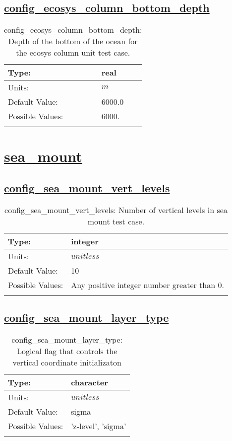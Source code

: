 \subsection[config\_ecosys\_column\_bottom\_depth]{\hyperref[sec:nm_tab_ecosys_column]{config\_ecosys\_column\_bottom\_depth}}
\label{subsec:nm_sec_config_ecosys_column_bottom_depth}
\begin{center}
\begin{longtable}{| p{2.0in} || p{4.0in} |}
    \hline
    Type: & real \\
    \hline
    Units: & $m$ \\
    \hline
    Default Value: & 6000.0 \\
    \hline
    Possible Values: & 6000. \\
    \hline
    \caption{config\_ecosys\_column\_bottom\_depth: Depth of the bottom of the ocean for the ecosys column unit test case.}
\end{longtable}
\end{center}
\section[sea\_mount]{\hyperref[sec:nm_tab_sea_mount]{sea\_mount}}
\label{sec:nm_sec_sea_mount}
\subsection[config\_sea\_mount\_vert\_levels]{\hyperref[sec:nm_tab_sea_mount]{config\_sea\_mount\_vert\_levels}}
\label{subsec:nm_sec_config_sea_mount_vert_levels}
\begin{center}
\begin{longtable}{| p{2.0in} || p{4.0in} |}
    \hline
    Type: & integer \\
    \hline
    Units: & $unitless$ \\
    \hline
    Default Value: & 10 \\
    \hline
    Possible Values: & Any positive integer number greater than 0. \\
    \hline
    \caption{config\_sea\_mount\_vert\_levels: Number of vertical levels in sea mount test case.}
\end{longtable}
\end{center}
\subsection[config\_sea\_mount\_layer\_type]{\hyperref[sec:nm_tab_sea_mount]{config\_sea\_mount\_layer\_type}}
\label{subsec:nm_sec_config_sea_mount_layer_type}
\begin{center}
\begin{longtable}{| p{2.0in} || p{4.0in} |}
    \hline
    Type: & character \\
    \hline
    Units: & $unitless$ \\
    \hline
    Default Value: & sigma \\
    \hline
    Possible Values: & 'z-level', 'sigma' \\
    \hline
    \caption{config\_sea\_mount\_layer\_type: Logical flag that controls the vertical coordinate initializaton}
\end{longtable}
\end{center}
